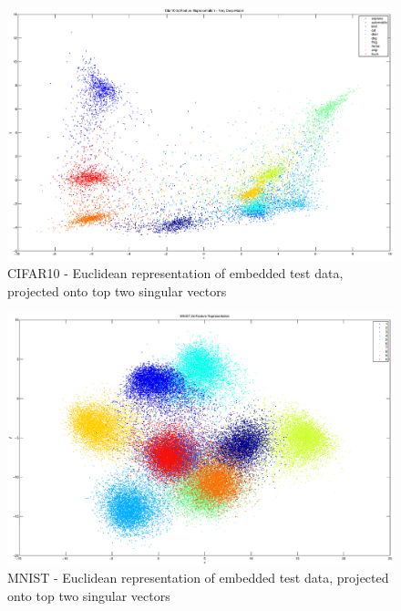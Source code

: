 \documentclass{article} %
\begin{document}
\begin{figure}[h]
\begin{center}
\includegraphics[width=1\linewidth]{Rep.eps}
\end{center}
   \caption{CIFAR10 - Euclidean representation of embedded test data, projected onto top two singular vectors}\label{TripletRepCIFAR10}
\end{figure}
\begin{figure}[h]
\begin{center}
\includegraphics[width=1\linewidth]{mnist-rep.eps}
\end{center}
   \caption{MNIST - Euclidean representation of embedded test data, projected onto top two singular vectors}\label{TripletRepMNIST}
\end{figure}
\end{document}
